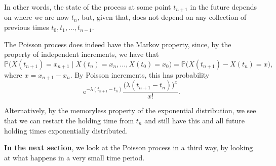 \documentclass[
  a4paper,
]{article}
\theoremstyle{definition}
\theoremstyle{definition}
\theoremstyle{definition}
\theoremstyle{remark}
\begin{document}
In other words, the state of the process at some point \(t_{n+1}\) in the future depends on where we are now \(t_n\), but, given that, does not depend on any collection of previous times \(t_0, t_1, \dots, t_{n-1}\).

The Poisson process does indeed have the Markov property, since, by the property of independent increments, we have that
\[ \mathbb P\big( X(t_{n+1}) = x_{n+1} \mid X(t_n) = x_n, \dots, X(t_0) = x_0 \big) = \mathbb P\big( X(t_{n+1}) -X(t_n) = x\big) , \]
where \(x = x_{n+1}-x_n\). By Poisson increments, this has probability
\[ \mathrm{e}^{-\lambda(t_{n+1}-t_n)} \frac{\big(\lambda(t_{n+1}-t_n)\big)^x}{x!} . \]

Alternatively, by the memoryless property of the exponential distribution, we see that we can restart the holding time from \(t_n\) and still have this and all future holding times exponentially distributed.

\textbf{In the next section}, we look at the Poisson process in a third way, by looking at what happens in a very small time period.
\end{document}
